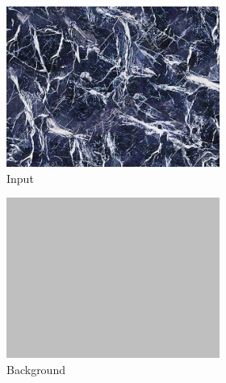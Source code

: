 \begin{figure}[]
\begin{subfigure}{\textwidth}
        \begin{subfigure}{0.19\textwidth}
            \centering
            \includegraphics[width=\textwidth]{images/04-experiment02/isolating_issues/target.jpg}
            \caption*{Input}
        \end{subfigure}
        \hfill
        \begin{subfigure}{0.19\textwidth}
            \centering
            \includegraphics[width=\textwidth]{images/04-experiment02/isolating_issues/190_bg.jpg}
            \caption*{Background}
        \end{subfigure}
        \hfill
        \begin{subfigure}{0.19\textwidth}

\end{subfigure}
\end{subfigure}
\end{figure}
